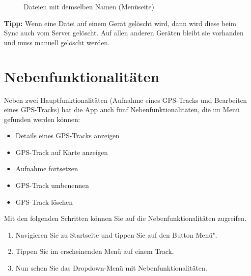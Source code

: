 \documentclass{article}
\begin{document}
\begin{enumerate}
\begin{figure}[H]
            \centering
            \caption{Dateien mit demselben Namen (Menüseite)}
        \end{figure}
        \textbf{Tipp:} Wenn eine Datei auf einem Gerät gelöscht wird, dann wird diese beim Sync auch vom Server gelöscht.
        Auf allen anderen Geräten bleibt sie vorhanden und muss manuell gelöscht werden.
    \end{enumerate}
    
    \newpage

\section{Nebenfunktionalitäten}
	Neben zwei Hauptfunktionalitäten (Aufnahme eines GPS-Tracks und Bearbeiten eines GPS-Tracks) hat die App auch fünf Nebenfunktionalitäten, die im Menü gefunden werden können: \\
	\begin{itemize}
		\item Details eines GPS-Tracks anzeigen
		\item GPS-Track auf Karte anzeigen
		\item Aufnahme fortsetzen
		\item GPS-Track umbenennen
		\item GPS-Track löschen	
	\end{itemize}
	Mit den folgenden Schritten können Sie auf die Nebenfunktionalitäten zugreifen.\\
	\begin{enumerate}
		\item Navigieren Sie zu Startseite und tippen Sie auf den Button \glqq Menü".
		\item Tippen Sie im erscheinenden Menü auf einem Track.
		\item Nun sehen Sie das Dropdown-Menü mit Nebenfunktionalitäten.
	\end{enumerate}		
\end{document}
